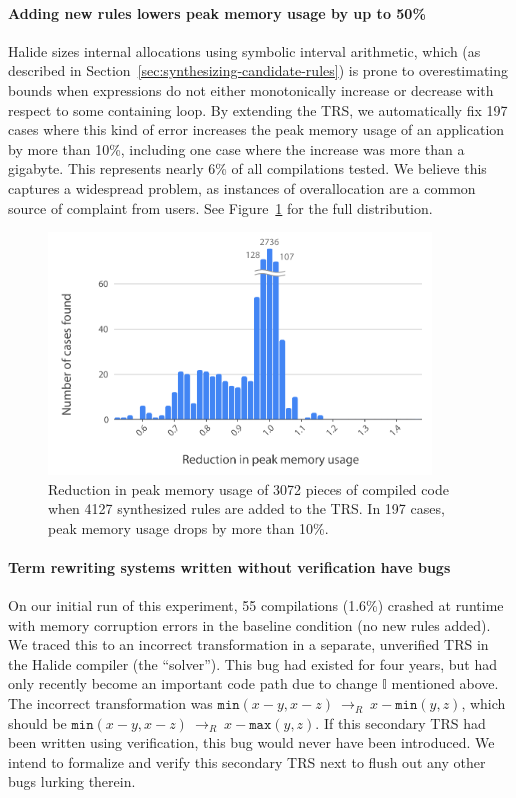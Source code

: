 \documentclass[acmsmall,review]{acmart}\settopmatter{printfolios=true,printccs=false,printacmref=false}
\newcommand{\hmax}[0]{\texttt{max}}
\newcommand{\hmin}[0]{\texttt{min}}
\newcommand{\rewrites}[0]{\:\rightarrow_{R}\:}
\begin{document}
\paragraph{Adding new rules lowers peak memory usage by up to 50\%}
Halide sizes internal allocations using symbolic interval arithmetic,
which (as described in Section~\ref{sec:synthesizing-candidate-rules})
is prone to overestimating bounds when
expressions do not either monotonically increase or decrease with
respect to some containing loop. By extending the TRS, we
automatically fix 197 cases where this kind of error increases the
peak memory usage of an application by more than 10\%, including one
case where the increase was more than a gigabyte. This represents
nearly 6\% of all compilations tested. We believe this captures a
widespread problem, as instances of overallocation are a common source
of complaint from users. See Figure~\ref{fig:peakmemoryhistogram} for
the full distribution. 

\begin{figure}
  \includegraphics[width=4in]{figures/memoryhistogram.pdf}
\caption{Reduction in peak memory usage of 3072 pieces of compiled
  code when 4127 synthesized rules are added to the TRS. In 197 cases,
  peak memory usage drops by more than 10\%.}
\label{fig:peakmemoryhistogram}
\end{figure}

\paragraph{Term rewriting systems written without verification have bugs}
On our initial run of this experiment, 55 compilations (1.6\%) crashed
at runtime with memory corruption errors in the baseline condition (no
new rules added). We traced this to an incorrect transformation in a
separate, unverified TRS in the Halide compiler (the ``solver''). This
bug had existed for four years, but had only recently become an
important code path due to change $\mathbb{I}$ mentioned above. The
incorrect transformation was $\hmin(x - y, x - z) \rewrites x - \hmin(y, z)$,
which should be $\hmin(x - y, x - z) \rewrites x - \hmax(y, z)$. If this
secondary TRS had been written using verification, this bug would
never have been introduced. We intend to formalize and verify this
secondary TRS next to flush out any other bugs lurking therein.
\end{document}
